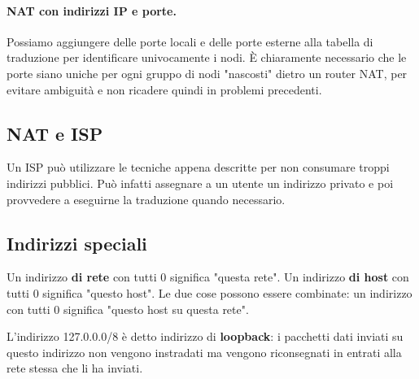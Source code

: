         \paragraph{NAT con indirizzi IP e porte.} Possiamo aggiungere delle porte locali e delle porte esterne alla tabella di traduzione per identificare univocamente i nodi. È chiaramente necessario che le porte siano uniche per ogni gruppo di nodi "nascosti" dietro un router NAT, per evitare ambiguità e non ricadere quindi in problemi precedenti.
        
    \subsection{NAT e ISP}
        Un ISP può utilizzare le tecniche appena descritte per non consumare troppi indirizzi pubblici. Può infatti assegnare a un utente un indirizzo privato e poi provvedere a eseguirne la traduzione quando necessario.
        
    \subsection{Indirizzi speciali}
        Un indirizzo \textbf{di rete} con tutti 0 significa "questa rete". Un indirizzo \textbf{di host} con tutti 0 significa "questo host". Le due cose possono essere combinate: un indirizzo con tutti 0 significa "questo host su questa rete".
        
        L'indirizzo 127.0.0.0/8 è detto indirizzo di \textbf{loopback}: i pacchetti dati inviati su questo indirizzo non vengono instradati ma vengono riconsegnati in entrati alla rete stessa che li ha inviati.